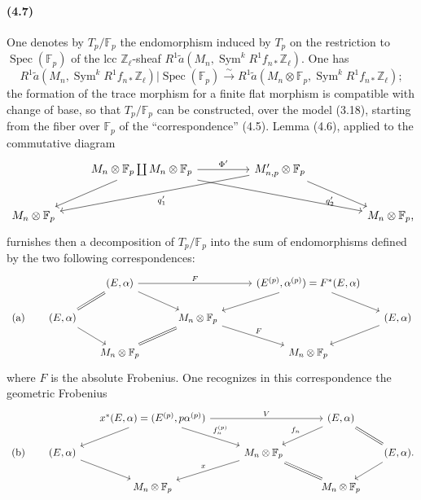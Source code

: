 \documentclass[10pt]{article}
\newcommand{\Z}{\mathbb Z}
\newcommand{\Sym}{\operatorname{Sym}}
\newcommand{\Spec}{\operatorname{Spec}}
\newcommand{\F}{\mathbb F}
\begin{document}
\paragraph{(4.7)}
One denotes by $T_p/\F_p$ the endomorphism induced by $T_p$ on the restriction to $\Spec(\F_p)$ of the lcc $\Z_\ell$-sheaf $R^1\widetilde a(M_n,\Sym^k R^1f_{n*}\Z_\ell)$. One has
\[
R^1\widetilde a(M_n,\Sym^k R^1f_{n*}\Z_\ell)|\Spec(\F_p)
\xrightarrow{\sim}
R^1\widetilde a(M_n\otimes\F_p,\Sym^k R^1f_{n*}\Z_\ell);
\]
the formation of the trace morphism for a finite flat morphism is compatible with change of base, so that $T_p/\F_p$ can be constructed, over the model (3.18), starting from the fiber over $\F_p$ of the ``correspondence'' (4.5). Lemma (4.6), applied to the commutative diagram
\[
\begin{tikzcd}[column sep=2.3em,row sep=2.25em]
& M_n\otimes\F_p\coprod M_n\otimes\F_p
  \arrow[rr,"\Phi'"]
  \arrow[dl]
  \arrow[drrrr]
&& M'_{n,p}\otimes\F_p
  \arrow[dlll,"q'_1"]
  \arrow[drr,"q'_2"'] & \\
M_n\otimes\F_p &&&&& M_n\otimes\F_p\rlap{,}
\end{tikzcd}
\]
furnishes then a decomposition of $T_p/\F_p$ into the sum of endomorphisms defined by the two following correspondences:
\[
\begin{tikzcd}[column sep=1.45em,row sep=1.65em]
&& (E,\alpha)
  \arrow[rrrr,"F"]
  \arrow[dl,equal]
  \arrow[drr]
&&&& (E^{(p)},\alpha^{(p)})=F^*(E,\alpha)
  \arrow[dll]
  \arrow[dr]
& \\
\textup{(a)} & (E,\alpha)
  \arrow[dr]
&&& M_n\otimes\F_p
  \arrow[dll,equal]
  \arrow[drr,"F"]
&&& (E,\alpha)
  \arrow[dl] \\
&& M_n\otimes\F_p &&&& M_n\otimes\F_p &
\end{tikzcd}
\]
where $F$ is the absolute Frobenius. One recognizes in this correspondence the geometric Frobenius
\[
\begin{tikzcd}[column sep=1.45em,row sep=1.65em]
&& x^*(E,\alpha)=(E^{(p)},p\alpha^{(p)})
  \arrow[rrrr,"V"]
  \arrow[dl]
  \arrow[drr,"f_n^{(p)}"]
&&&& (E,\alpha)
  \arrow[dll,"f_n"']
  \arrow[dr,equal]
& \\
\textup{(b)} & (E,\alpha)
  \arrow[dr]
&&& M_n\otimes\F_p
  \arrow[dll,"x"']
  \arrow[drr,equal]
&&& (E,\alpha)\rlap{.}
  \arrow[dl] \\
&& M_n\otimes\F_p &&&& M_n\otimes\F_p & {}
\end{tikzcd}
\]
\end{document}
